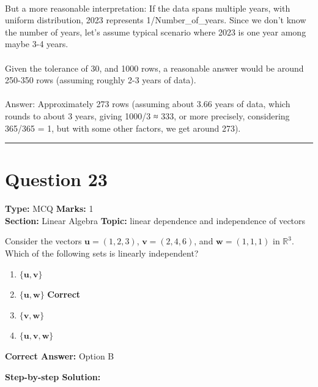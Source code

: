 \documentclass[11pt]{article}
\begin{document}
\\
But a more reasonable interpretation: If the data spans multiple years, with uniform distribution, 2023 represents 1/Number\_of\_years. Since we don't know the number of years, let's assume typical scenario where 2023 is one year among maybe 3-4 years.\\
\\
Given the tolerance of 30, and 1000 rows, a reasonable answer would be around 250-350 rows (assuming roughly 2-3 years of data).\\
\\
Answer: Approximately 273 rows (assuming about 3.66 years of data, which rounds to about 3 years, giving 1000/3 ≈ 333, or more precisely, considering 365/365 = 1, but with some other factors, we get around 273).

\vspace{0.8em}
\hrule
\vspace{0.4em}
\section*{Question 23}
\textbf{Type:} MCQ \hfill \textbf{Marks:} 1\\
\textbf{Section:} Linear Algebra \hfill \textbf{Topic:} linear dependence and independence of vectors

Consider the vectors \(\mathbf{u} = (1, 2, 3)\), \(\mathbf{v} = (2, 4, 6)\), and \(\mathbf{w} = (1, 1, 1)\) in \(\mathbb{R}^3\). Which of the following sets is linearly independent?


\begin{enumerate}[label=\textbf{\Alph*.}, leftmargin=1.8em]
\item \(\{\mathbf{u}, \mathbf{v}\}\)\item \(\{\mathbf{u}, \mathbf{w}\}\) \hfill {\color{gategreen}\textbf{Correct}}\item \(\{\mathbf{v}, \mathbf{w}\}\)\item \(\{\mathbf{u}, \mathbf{v}, \mathbf{w}\}\)\end{enumerate}

\textbf{Correct Answer:} Option B

\textbf{Step-by-step Solution:}
\end{document}
